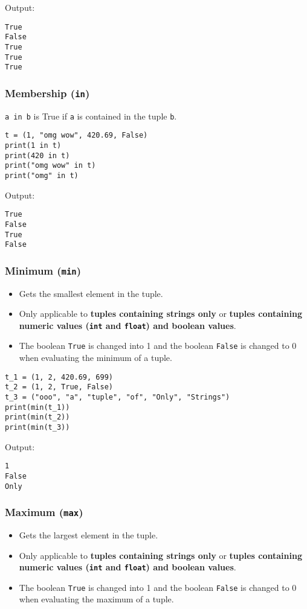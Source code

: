 \documentclass[11pt]{article}
\begin{document}
 \noindent Output:

\begin{verbatim}
True
False
True
True
True
\end{verbatim}

\subsubsection{Membership (\texttt{in})}
\label{sec:org784b964}
\texttt{a in b} is True if \texttt{a} is contained in the tuple \texttt{b}.
\begin{verbatim}
t = (1, "omg wow", 420.69, False)
print(1 in t)
print(420 in t)
print("omg wow" in t)
print("omg" in t)
\end{verbatim}

 \noindent Output:

\begin{verbatim}
True
False
True
False
\end{verbatim}

\subsubsection{Minimum (\texttt{min})}
\label{sec:orgb6b7a62}
\begin{itemize}
\item Gets the smallest element in the tuple.
\item Only applicable to \textbf{tuples containing strings only} or \textbf{tuples containing numeric values (\texttt{int} and \texttt{float}) and boolean values}.
\item The boolean \texttt{True} is changed into 1 and the boolean \texttt{False} is changed to 0 when evaluating the minimum of a tuple.
\end{itemize}

\begin{verbatim}
t_1 = (1, 2, 420.69, 699)
t_2 = (1, 2, True, False)
t_3 = ("ooo", "a", "tuple", "of", "Only", "Strings")
print(min(t_1))
print(min(t_2))
print(min(t_3))
\end{verbatim}

 \noindent Output:

\begin{verbatim}
1
False
Only
\end{verbatim}

\subsubsection{Maximum (\texttt{max})}
\label{sec:org22f50f9}
\begin{itemize}
\item Gets the largest element in the tuple.
\item Only applicable to \textbf{tuples containing strings only} or \textbf{tuples containing numeric values (\texttt{int} and \texttt{float}) and boolean values}.
\item The boolean \texttt{True} is changed into 1 and the boolean \texttt{False} is changed to 0 when evaluating the maximum of a tuple.
\end{itemize}
\end{document}
